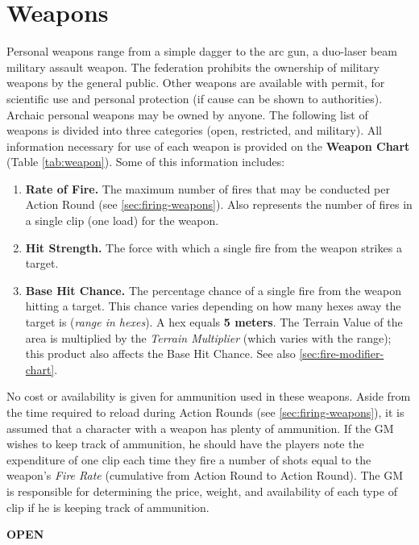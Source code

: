 \section{Weapons}
\label{sec:weapons}

Personal weapons range from a simple dagger to the arc gun, a
duo-laser beam military assault weapon. The federation prohibits the
ownership of military weapons by the general public. Other weapons are
available with permit, for scientific use and personal protection (if
cause can be shown to authorities). Archaic personal weapons may be
owned by anyone. The following list of weapons is divided into three
categories (open, restricted, and military). All information necessary
for use of each weapon is provided on the \textbf{Weapon Chart} (Table
\vref{tab:weapon}).  Some of this information includes:

\begin{enumerate}
\item \textbf{Rate of Fire.} The maximum number of fires that may be conducted
  per Action Round (see \ref{sec:firing-weapons}). Also represents the number
  of fires in a single clip (one load) for the weapon.
\item \textbf{Hit Strength.} The force with which a single fire from the weapon
  strikes a target.
\item \textbf{Base Hit Chance.} The percentage chance of a single fire from the
  weapon hitting a target. This chance varies depending on how many
  hexes away the target is (\emph{range in hexes}). A hex equals \textbf{5
  meters}.  The Terrain Value of the area is multiplied by the
  \emph{Terrain Multiplier} (which varies with the range); this
  product also affects the Base Hit Chance. See also \ref{sec:fire-modifier-chart}.
\end{enumerate}

No cost or availability is given for ammunition used in these weapons.
Aside from the time required to reload during Action Rounds (see
\ref{sec:firing-weapons}), it is assumed that a character with a
weapon has plenty of ammunition. If the GM wishes to keep track of
ammunition, he should have the players note the expenditure of one
clip each time they fire a number of shots equal to the weapon's
\emph{Fire Rate} (cumulative from Action Round to Action Round). The
GM is responsible for determining the price, weight, and availability
of each type of clip if he is keeping track of ammunition.

\medskip

\noindent\textbf{OPEN}

